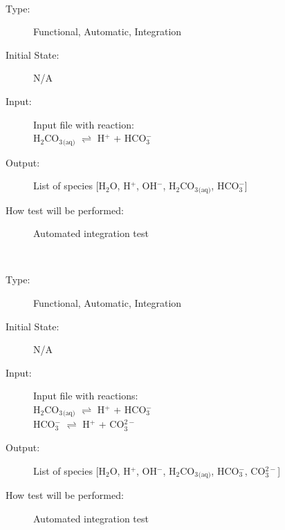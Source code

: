 \documentclass[12pt, titlepage]{article}
\newcounter{testnum} %
\begin{document}
\begin{addmargin}[2em]{0em}
\\
\begin{addmargin}[2em]{0em}
\begin{description}
\item[Type:] Functional, Automatic, Integration
					
\item[Initial State:] N/A
					
\item[Input:] Input file with reaction:\\
H$_2$CO$_3$$_\text{(aq)}$ $\rightleftharpoons$ H$^+$ + HCO$_3^-$\\
					
\item[Output:] List of species [H$_2$O, H$^+$, OH$^-$, H$_2$CO$_3$$_\text{(aq)}$, HCO$_3^-$]
					
\item[How test will be performed:] Automated integration test\\
\end{description}
\end{addmargin}

\\
\begin{addmargin}[2em]{0em}
\begin{description}
\item[Type:] Functional, Automatic, Integration
					
\item[Initial State:] N/A
					
\item[Input:] Input file with reactions:\\
H$_2$CO$_3$$_\text{(aq)}$ $\rightleftharpoons$ H$^+$ + HCO$_3^-$\\
HCO$_3^-$ $\rightleftharpoons$ H$^+$ + CO$_3^{2-}$\\
					
\item[Output:] List of species [H$_2$O, H$^+$, OH$^-$, H$_2$CO$_3$$_\text{(aq)}$, HCO$_3^-$, CO$_3^{2-}$]
					
\item[How test will be performed:] Automated integration test\\
\end{description}
\end{addmargin}
\end{addmargin}
\end{document}
